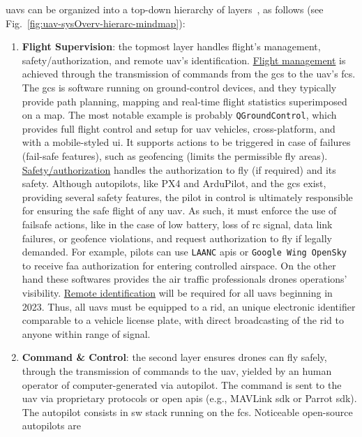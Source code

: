 \glspl{uav} can be organized into a top-down hierarchy of layers~\cite{glossner2021overview}, as follows
(see Fig.~\ref{fig:uav-sysOverv-hierarc-mindmap}):
\begin{enumerate}
\item \textbf{Flight Supervision}: the topmost layer handles flight's
  management, safety/authorization, and remote \gls{uav}'s
  identification. \underline{Flight management} is achieved through the
  transmission of commands from the \gls{gcs} to the \gls{uav}'s \gls{fcs}. The \gls{gcs} is
  software running on ground-control devices, and they typically provide path
  planning, mapping and real-time flight statistics superimposed on a map. The
  most notable example is probably \texttt{QGroundControl}, which provides full
  flight control and setup for \gls{uav} vehicles, cross-platform, and with a
  mobile-styled \gls{ui}. It supports actions to be triggered in case of
  failures (fail-safe features), such as geofencing (limits the permissible fly
  areas). \underline{Safety/authorization} handles the authorization to fly (if
  required) and its safety. Although autopilots, like PX4 and ArduPilot,
  and the \gls{gcs} exist, providing several safety features, the pilot in
  control is ultimately responsible for ensuring the safe flight of any
  \gls{uav}. As such, it must enforce the use of failsafe actions, like in the
  case of low battery, loss of \gls{rc} signal, data link failures, or geofence
  violations, and request authorization to fly if legally demanded. For example,
  pilots can use \texttt{LAANC} \glspl{api} or \texttt{Google Wing OpenSky} to
  receive \gls{faa} authorization for entering controlled airspace. On the other
  hand these softwares provides the air traffic professionals drones operations'
  visibility.
  \underline{Remote identification} will be required for all \glspl{uav}
  beginning in 2023. Thus, all \glspl{uav} must be equipped to a \gls{rid}, an
  unique electronic identifier comparable to a vehicle license plate, with direct
  broadcasting of the \gls{rid} to anyone within range of signal.
\item \textbf{Command \& Control}: the second layer ensures drones can fly
  safely, through the transmission of commands to the \gls{uav}, yielded by an
  human operator of computer-generated via autopilot. The command is sent to the
  \gls{uav} via proprietary protocols or open \glspl{api} (e.g., MAVLink
  \gls{sdk} or Parrot \gls{sdk}). The autopilot consists in \gls{sw} stack
  running on the \gls{fcs}. Noticeable open-source autopilots are

\end{enumerate}

